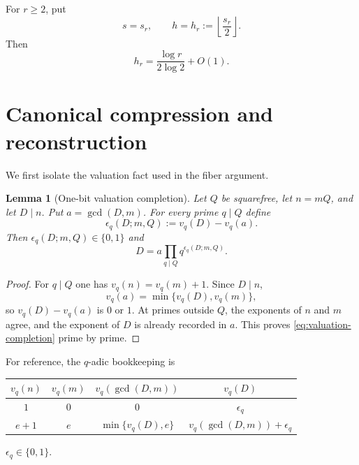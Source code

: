 \documentclass[11pt]{amsart}
\newtheorem{lemma}[lemma]{Lemma}
\theoremstyle{definition}
\theoremstyle{remark}
\numberwithin{equation}{section}
\begin{document}
For $r\ge2$, put
\begin{equation}\label{eq:sr-hr}
 s=s_r,
 \qquad
 h=h_r:=\left\lfloor\frac{s_r}{2}\right\rfloor.
\end{equation}
Then
\begin{equation}\label{eq:hr-asymp}
 h_r=\frac{\log r}{2\log 2}+O(1).
\end{equation}

\section{Canonical compression and reconstruction}

We first isolate the valuation fact used in the fiber argument.

\begin{lemma}[One-bit valuation completion]\label{lem:valuation-bit}
Let $Q$ be squarefree, let $n=mQ$, and let $D\mid n$.  Put
$a=\gcd(D,m)$.  For every prime $q\mid Q$ define
\[
 \epsilon_q(D;m,Q):=v_q(D)-v_q(a).
\]
Then $\epsilon_q(D;m,Q)\in\{0,1\}$ and
\begin{equation}\label{eq:valuation-completion}
 D=a\prod_{q\mid Q}q^{\epsilon_q(D;m,Q)}.
\end{equation}
\end{lemma}

\begin{proof}
For $q\mid Q$ one has $v_q(n)=v_q(m)+1$.  Since $D\mid n$,
\[
 v_q(a)=\min\{v_q(D),v_q(m)\},
\]
so $v_q(D)-v_q(a)$ is $0$ or $1$.  At primes outside $Q$, the
exponents of $n$ and $m$ agree, and the exponent of $D$ is already
recorded in $a$.  This proves \eqref{eq:valuation-completion} prime by
prime.
\end{proof}

For reference, the $q$-adic bookkeeping is
\begin{center}
\begin{tabular}{@{}cccc@{}}
\toprule
$v_q(n)$ & $v_q(m)$ & $v_q(\gcd(D,m))$ & $v_q(D)$ \\
\midrule
$1$ & $0$ & $0$ & $\epsilon_q$ \\
$e+1$ & $e$ & $\min\{v_q(D),e\}$
    & $v_q(\gcd(D,m))+\epsilon_q$ \\
\bottomrule
\end{tabular}
\qquad $\epsilon_q\in\{0,1\}$.
\end{center}
\end{document}
